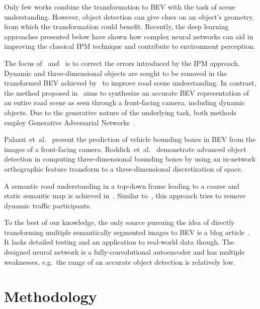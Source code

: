 \documentclass[a4paper, 10pt, conference]{ieeeconf}
\begin{document}
Only few works combine the transformation to BEV with the task of scene understanding. However, object detection can give clues on an object's geometry, from which the transformation could benefit. Recently, the deep learning approaches presented below have shown how complex neural networks can aid in improving the classical IPM technique and contribute to environment perception.

The focus of~\cite{BrulsEtAl_RightAngledPerspective_2019} and~\cite{ZhuEtAl_GenerativeAdversarialFrontal_2019} is to correct the errors introduced by the IPM approach. Dynamic and three-dimensional objects are sought to be removed in the transformed BEV achieved by~\cite{BrulsEtAl_RightAngledPerspective_2019} to improve road scene understanding. In contrast, the method proposed in~\cite{ZhuEtAl_GenerativeAdversarialFrontal_2019} aims to synthesize an accurate BEV representation of an entire road scene as seen through a front-facing camera, including dynamic objects. Due to the generative nature of the underlying task, both methods employ Generative Adversarial Networks~\cite{Schmidhuber_MakingWorldDifferentiable_1990, GoodfellowEtAl_GenerativeAdversarialNets_2014}.

Palazzi~et~al.~\cite{PalazziEtAl_LearningMapVehicles_2017} present the prediction of vehicle bounding boxes in BEV from the images of a front-facing camera. Roddick~et~al.~\cite{RoddickEtAl_OrthographicFeatureTransform_2019} demonstrate advanced object detection in computing three-dimensional bounding boxes by using an in-network orthographic feature transform to a three-dimensional discretization of space.

A semantic road understanding in a top-down frame leading to a coarse and static semantic map is achieved in~\cite{SenguptaEtAl_AutomaticDenseVisual_2012}. Similar to~\cite{BrulsEtAl_RightAngledPerspective_2019}, this approach tries to remove dynamic traffic participants.

To the best of our knowledge, the only source pursuing the idea of directly transforming multiple semantically segmented images to BEV is a blog article~\cite{Dziubinski_SemanticSegmentationSemantic_2019}. It lacks detailed testing and an application to real-world data though. The designed neural network is a fully-convolutional autoencoder and has multiple weaknesses, e.g.\ the range of an accurate object detection is relatively low.


\section{Methodology}\label{sec:Methodology}
\end{document}
